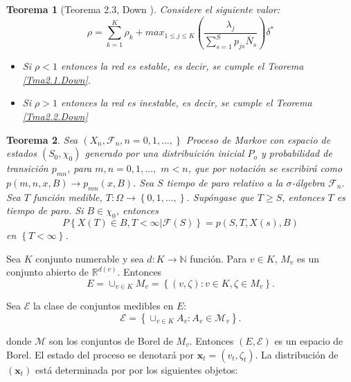 \documentclass{article}
\newtheorem{Teo}{Teorema}[section]
\newcommand{\nat}{\mathbb{N}}
\newcommand{\rea}{\mathbb{R}}
\numberwithin{equation}{section}
\begin{document}
\begin{Teo}[Teorema 2.3, Down \cite{Down}]\label{Tma2.3.Down}
Considere el siguiente valor:
\begin{equation}\label{Eq.Rho.1serv}
\rho=\sum_{k=1}^{K}\rho_{k}+max_{1\leq j\leq K}\left(\frac{\lambda_{j}}{\sum_{s=1}^{S}p_{js}\overline{N}_{s}}\right)\delta^{*}
\end{equation}
\begin{itemize}
\item[i)] Si $\rho<1$ entonces la red es estable, es decir, se cumple el Teorema \ref{Tma2.1.Down}.

\item[ii)] Si $\rho>1$ entonces la red es inestable, es decir, se cumple el Teorema \ref{Tma2.2.Down}
\end{itemize}
\end{Teo}

\begin{Teo}
Sea $\left(X_{n},\mathcal{F}_{n},n=0,1,\ldots,\right\}$ Proceso de
Markov con espacio de estados $\left(S_{0},\chi_{0}\right)$
generado por una distribuici\'on inicial $P_{o}$ y probabilidad de
transici\'on $p_{mn}$, para $m,n=0,1,\ldots,$ $m<n$, que por
notaci\'on se escribir\'a como $p\left(m,n,x,B\right)\rightarrow
p_{mn}\left(x,B\right)$. Sea $S$ tiempo de paro relativo a la
$\sigma$-\'algebra $\mathcal{F}_{n}$. Sea $T$ funci\'on medible,
$T:\Omega\rightarrow\left\{0,1,\ldots,\right\}$. Sup\'ongase que
$T\geq S$, entonces $T$ es tiempo de paro. Si $B\in\chi_{0}$,
entonces
\begin{equation}\label{Prop.Fuerte.Markov}
P\left\{X\left(T\right)\in
B,T<\infty|\mathcal{F}\left(S\right)\right\} =
p\left(S,T,X\left(s\right),B\right)
\end{equation}
en $\left\{T<\infty\right\}$.
\end{Teo}


Sea $K$ conjunto numerable y sea $d:K\rightarrow\nat$ funci\'on.
Para $v\in K$, $M_{v}$ es un conjunto abierto de
$\rea^{d\left(v\right)}$. Entonces \[E=\cup_{v\in
K}M_{v}=\left\{\left(v,\zeta\right):v\in K,\zeta\in
M_{v}\right\}.\]

Sea $\mathcal{E}$ la clase de conjuntos medibles en $E$:
\[\mathcal{E}=\left\{\cup_{v\in K}A_{v}:A_{v}\in \mathcal{M}_{v}\right\}.\]

donde $\mathcal{M}$ son los conjuntos de Borel de $M_{v}$.
Entonces $\left(E,\mathcal{E}\right)$ es un espacio de Borel. El
estado del proceso se denotar\'a por
$\mathbf{x}_{t}=\left(v_{t},\zeta_{t}\right)$. La distribuci\'on
de $\left(\mathbf{x}_{t}\right)$ est\'a determinada por por los
siguientes objetos:
\end{document}
